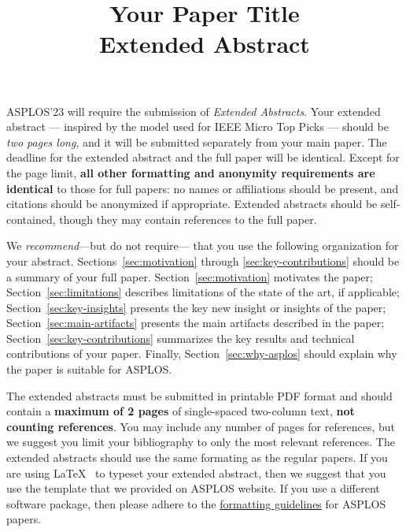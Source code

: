 \documentclass[pageno]{jpaper}
\begin{document}
\title{Your Paper Title \\ \textbf{Extended Abstract}}

\date{}

\maketitle

\thispagestyle{empty}




ASPLOS'23 will require the submission of {\it Extended
Abstracts}. Your extended abstract --- inspired by the model used for
IEEE Micro Top
Picks --- should be {\it two pages long}, and it will be submitted separately
from your main paper. The deadline for the extended abstract and the
full paper will be identical. Except for the page limit, \textbf{all other
formatting and anonymity requirements are identical} to those for full
papers: no names or affiliations should be present, and citations should
be anonymized if appropriate. Extended abstracts should be self-contained, though they may
contain references to the full paper.

We \emph{recommend}---but do not require--- that you use
the following organization for your abstract. 
Sections~\ref{sec:motivation} through \ref{sec:key-contributions}
should be a summary of your full paper. Section~\ref{sec:motivation}
motivates the paper; Section~\ref{sec:limitations} describes
limitations of the state of the art, if applicable;
Section~\ref{sec:key-insights} presents the key new insight or
insights of the paper; 
Section~\ref{sec:main-artifacts} presents the main artifacts described
in the paper;  Section~\ref{sec:key-contributions} summarizes the key
results and technical contributions of your paper. Finally,
Section~\ref{sec:why-asplos} should explain why the paper is suitable
for ASPLOS. 

The extended abstracts must be submitted in printable PDF format and should contain a
{\bf maximum of 2 pages} of single-spaced two-column text, {\bf not
  counting references}.  You may include any number of pages for
references, but we suggest you limit your bibliography to
only the most relevant references. The extended
abstracts should use the same formating as the regular papers. If you are using
\LaTeX~\cite{lamport94} to typeset your extended abstract, then we suggest that
you use the template that we provided on ASPLOS website.
If you use a different
software package, then please adhere to the
\href{https://asplos-conference.org/submissions/}{formatting guidelines}
for ASPLOS papers.
\end{document}
